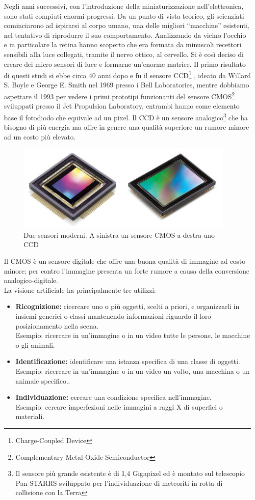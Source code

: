 Negli anni successivi, con l'introduzione della miniaturizzazione nell'elettronica, 
sono stati compiuti enormi progressi. Da un punto di vista teorico, gli scienziati 
cominciarono ad ispirarsi al corpo umano, una delle migliori ``macchine'' esistenti, 
nel tentativo di riprodurre il suo comportamento. Analizzando da vicino
l'occhio e in particolare la retina hanno scoperto che era formata da minuscoli 
recettori sensibili alla luce collegati, tramite il nervo ottico, al cervello. 
Si è così deciso di creare dei 
micro sensori di luce e formarne un'enorme matrice. Il primo risultato di questi studi 
si ebbe circa 40 anni dopo e fu il sensore CCD\footnote{Charge-Coupled Device}
, ideato da Willard S. Boyle e George E. Smith nel 1969 presso i Bell Laboratories,
mentre dobbiamo aspettare il 1993 per vedere i primi prototipi funzionanti del 
sensore CMOS\footnote{Complementary Metal-Oxide-Semiconductor} sviluppati presso 
il Jet Propulsion Laboratory, entrambi hanno come elemento base il fotodiodo che 
equivale ad un pixel. Il CCD è un sensore 
analogico\footnote{Il sensore più grande esistente è di 1,4 Gigapixel ed è 
montato sul telescopio Pan-STARRS sviluppato per l'individuazione di meteoriti in
 rotta di collisione con la Terra} che ha bisogno di più energia 
ma offre in genere una qualità superiore un rumore minore ad un costo più elevato.\\
\begin{figure}[!htb] \center
\includegraphics[scale=0.8]{immagini/ccd-cmos.png}
\caption{Due sensori moderni. A sinistra un sensore CMOS a destra uno CCD} 
\end{figure}
Il CMOS è un sensore digitale che offre una buona qualità di immagine ad costo minore;
per contro l'immagine presenta un forte rumore a causa della conversione 
analogico-digitale.\\
La visione artificiale ha principalmente tre utilizzi:
\begin{itemize}
\item \textbf{Ricognizione:} ricercare uno o più oggetti, scelti a priori, e organizzarli in 
insiemi generici o classi mantenendo informazioni riguardo il loro posizionamento 
nella scena. \\Esempio: ricercare in un'immagine o in un video tutte le persone, 
le macchine o gli animali. 
\item \textbf{Identificazione:} identificare una istanza specifica di una classe 
di oggetti. \\Esempio: ricercare in un'immagine o in un video un volto, 
una macchina o un animale specifico.. 
\item \textbf{Individuazione:} cercare una condizione specifica nell'immagine. 
\\Esempio: cercare imperfezioni nelle immagini a raggi X di superfici o materiali.
\end{itemize}

